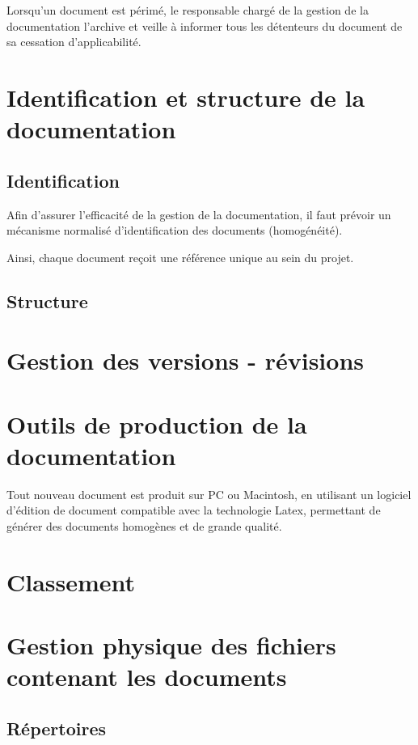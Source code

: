 \documentclass[a4paper]{article}
\begin{document}
Lorsqu'un document est périmé, le responsable chargé de la gestion de la documentation l'archive et veille à informer tous les détenteurs du document de sa cessation d'applicabilité.

\section{Identification et structure de la documentation}

\subsection{Identification}

Afin d’assurer l’efficacité de la gestion de la documentation, il faut prévoir un mécanisme normalisé d’identification des documents (homogénéité).

Ainsi, chaque document reçoit une référence unique au sein du projet.

\subsection{Structure}

\section{Gestion des versions - révisions}

\section{Outils de production de la documentation}

Tout nouveau document est produit sur PC ou Macintosh, en utilisant un logiciel d'édition de document compatible avec la technologie Latex, permettant de générer des documents homogènes et de grande qualité.

\section{Classement}

\section{Gestion physique des fichiers contenant les documents}

\subsection{Répertoires}
\end{document}
